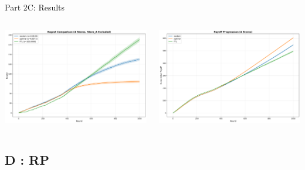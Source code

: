 \documentclass{beamer}
\begin{document}
\begin{frame}{Part 2C: Results}
\begin{columns}[T,onlytextwidth]
  \centering
  \includegraphics[width=\linewidth]{332Project2/figures/PP_regret.png}

  \centering
  \includegraphics[width=\linewidth]{332Project2/figures/PP_payoff.png}
\end{columns}
\end{frame}

\subsection{D : RP}
\end{document}
